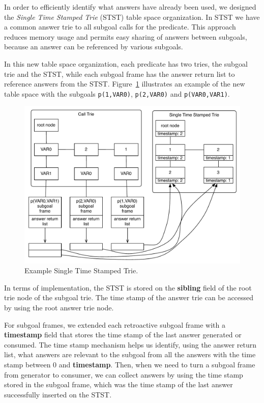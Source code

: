 In order to efficiently identify what answers have already been used, we designed
the \textit{Single Time Stamped Trie} (STST) table space organization.
In STST we have a common answer trie to all subgoal calls for the predicate. This approach
reduces memory usage and permits easy sharing of answers between subgoals, because an
answer can be referenced by various subgoals.

In this new table space organization, each predicate has two tries, the subgoal trie and
the STST, while each subgoal frame has the answer return list to reference answers
from the STST.
Figure~\ref{fig:stst} illustrates an example of the new table space with the
subgoals \texttt{p(1,VAR0)}, \texttt{p(2,VAR0)} and \texttt{p(VAR0,VAR1)}.

\begin{figure}[ht]
  \centering
    \includegraphics[scale=0.6]{stst.pdf}
  \caption{Example Single Time Stamped Trie.}
  \label{fig:stst}
\end{figure}

In terms of implementation, the STST is stored on the \textbf{sibling} field of the root
trie node of the subgoal trie. The time stamp of the answer trie can be accessed by
using the root answer trie node.

For subgoal frames, we extended each retroactive subgoal
frame with a \textbf{timestamp} field that stores the time stamp of the last answer
generated or consumed.
The time stamp mechanism helps us identify, using the answer return list, what answers
are relevant to the subgoal from all the answers with the time stamp between 0 and
\textbf{timestamp}. Then, when we need to turn a subgoal frame from generator to consumer,
we can collect answers by using the time stamp stored in the subgoal frame, which was the
time stamp of the last answer successfully inserted on the STST.

